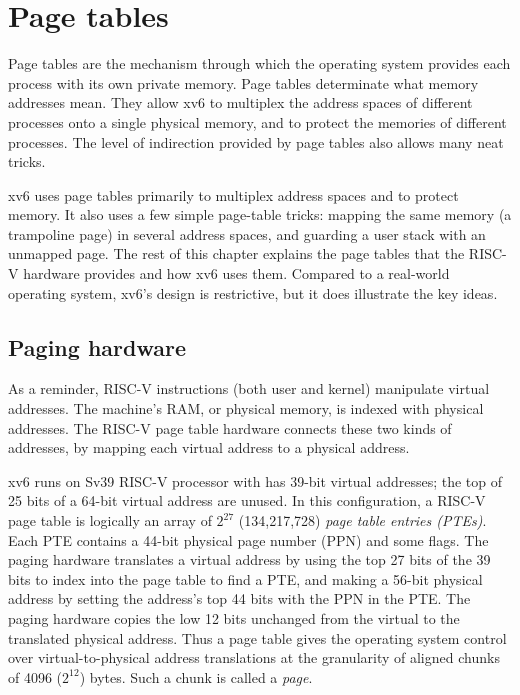 \chapter{Page tables}
\label{CH:MEM}

Page tables are the mechanism through which the operating system
provides each process with its own private memory.  Page tables
determinate what memory addresses mean.  They allow xv6 to multiplex
the address spaces of different processes onto a single physical
memory, and to protect the memories of different processes.  The level
of indirection provided by page tables also allows many neat tricks.

xv6 uses page tables primarily to multiplex address spaces and to
protect memory.  It also uses a few simple page-table tricks: mapping
the same memory (a trampoline page) in several address spaces, and
guarding a user stack with an unmapped page.  The rest of this chapter
explains the page tables that the RISC-V hardware provides and how xv6
uses them.  Compared to a real-world operating system, xv6's design is
restrictive, but it does illustrate the key ideas.
\section{Paging hardware}
As a reminder,
RISC-V instructions (both user and kernel) manipulate virtual addresses.
The machine's RAM, or physical memory, is indexed with physical
addresses.
The RISC-V page table hardware connects these two kinds of addresses,
by mapping each virtual address to a physical address.

xv6 runs on Sv39 RISC-V processor with has 39-bit virtual addresses;
the top of 25 bits of a 64-bit virtual address are unused.  In this
configuration, a RISC-V page table is logically an array of $2^{27}$
(134,217,728)
\textit{page table entries (PTEs)}.
Each PTE contains a
44-bit physical page number (PPN) and some flags. The paging
hardware translates a virtual address by using the top 27 bits
of the 39 bits to index into the page table to find a PTE, and
making a 56-bit physical address by setting
the address's top 44 bits with the PPN in the PTE.  The paging hardware
copies the low 12 bits unchanged from the virtual to the
translated physical address.  Thus a page table gives
the operating system control over virtual-to-physical address translations
at the granularity of aligned chunks of 4096 ($2^{12}$) bytes.
Such a chunk is called a
\textit{page}.

